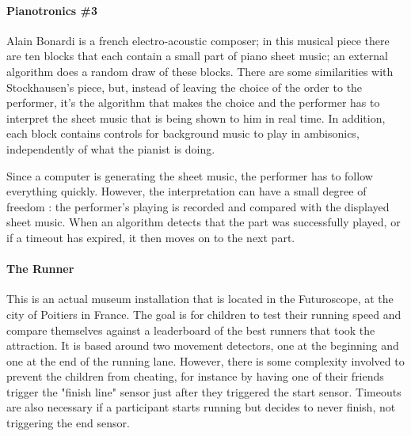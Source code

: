 \documentclass{sigchi}
\begin{document}
\paragraph{Pianotronics \#3}
Alain Bonardi is a french electro-acoustic composer; in this musical piece there are ten blocks that each contain a small part of piano sheet music; an external algorithm does a random draw of these blocks. There are some similarities with Stockhausen's piece, but, instead of leaving the choice of the order to the performer, it's the algorithm that makes the choice and the performer has to interpret the sheet music that is being shown to him in real time. In addition, each block contains controls for background music to play in ambisonics, independently of what the pianist is doing.

Since a computer is generating the sheet music, the performer has to follow everything quickly. However, the interpretation can have a small degree of freedom : the performer's playing is recorded and compared with the displayed sheet music. When an algorithm detects that the part was successfully played, or if a timeout has expired, it then moves on to the next part.

\paragraph{The Runner}
This is an actual museum installation that is located in the Futuroscope, at the city of Poitiers in France. The goal is for children to test their running speed and compare themselves against a leaderboard of the best runners that took the attraction. It is based around two movement detectors, one at the beginning and one at the end of the running lane. However, there is some complexity involved to prevent the children from cheating, for instance by having one of their friends trigger the "finish line" sensor just after they triggered the start sensor. Timeouts are also necessary if a participant starts running but decides to never finish, not triggering the end sensor.
\end{document}
